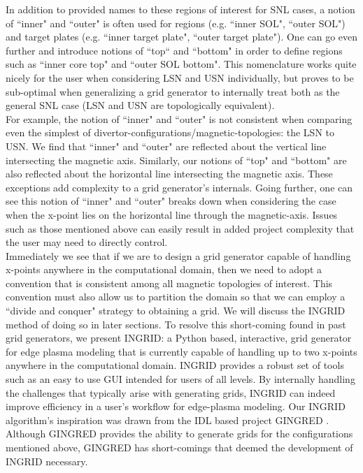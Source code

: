 In addition to provided names to these regions of interest for SNL cases, a notion of ``inner" and ``outer" is often used for regions (e.g. ``inner SOL", ``outer SOL") and target plates (e.g. ``inner target plate", ``outer target plate"). One can go even further and introduce notions of ``top`` and ``bottom" in order to define regions such as ``inner core top" and ``outer SOL bottom". This nomenclature works quite nicely for the user when considering LSN and USN individually, but proves to be sub-optimal when generalizing a grid generator to internally treat both as the general SNL case (LSN and USN are topologically equivalent). \\ \indent
For example, the notion of ``inner" and ``outer" is not consistent when comparing even the simplest of divertor-configurations/magnetic-topologies: the LSN to USN. We find that ``inner" and ``outer" are reflected about the vertical line intersecting the magnetic axis. Similarly, our notions of ``top" and ``bottom" are also reflected about the horizontal line intersecting the magnetic axis. These exceptions add complexity to a grid generator's internals. Going further, one can see this notion of ``inner" and ``outer" breaks down when considering the case when the x-point lies on the horizontal line through the magnetic-axis. Issues such as those mentioned above can easily result in added project complexity that the user may need to directly control.\\ \indent
Immediately we see that if we are to design a grid generator capable of handling x-points anywhere in the computational domain, then we need to adopt a convention that is consistent among all magnetic topologies of interest. This convention must also allow us to partition the domain so that we can employ a ``divide and conquer" strategy to obtaining a grid. We will discuss the INGRID method of doing so in later sections.
To resolve this short-coming found in past grid generators, we present INGRID: a Python based, interactive, grid generator for edge plasma modeling that is currently capable of handling up to two x-points anywhere in the computational domain. INGRID provides a robust set of tools such as an easy to use GUI intended for users of all levels. By internally handling the challenges that typically arise with generating grids, INGRID can indeed improve efficiency in a user's workflow for edge-plasma modeling. Our INGRID algorithm's inspiration was drawn from the IDL based project GINGRED \cite{izacard_umansky}. Although GINGRED provides the ability to generate grids for the configurations mentioned above, GINGRED has short-comings that deemed the development of INGRID necessary.\\

